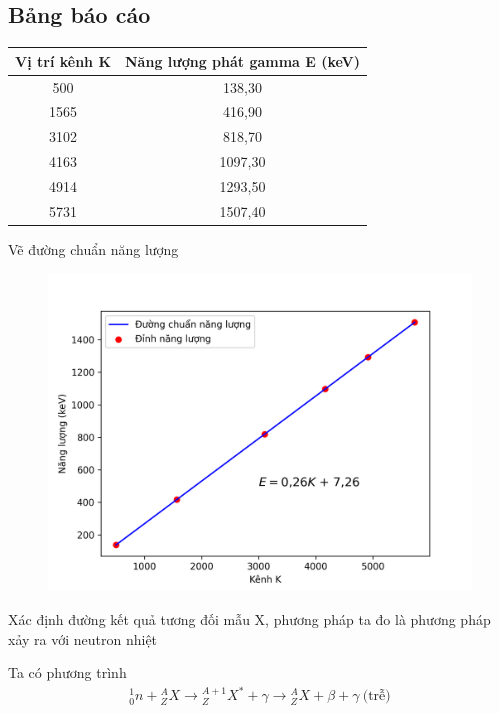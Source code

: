 \documentclass{article}
\begin{document}
\subsection{Bảng báo cáo}
\begin{table}[!ht]
    \centering
    \begin{tabular}{|c|c|}
    \hline
        Vị trí kênh K & Năng lượng phát gamma E (keV) \\ \hline
        500 & 138,30 \\ \hline
        1565 & 416,90 \\ \hline
        3102 & 818,70 \\ \hline
        4163 & 1097,30 \\ \hline
        4914 & 1293,50 \\ \hline
        5731 & 1507,40 \\ \hline
    \end{tabular}
\end{table}
Vẽ đường chuẩn năng lượng \\ \par
\begin{figure}[!th]
  \includegraphics[width=\linewidth]{plot}
\end{figure}
\newpage
Xác định đường kết quả tương đối mẫu X, phương pháp ta đo là phương pháp xảy ra với neutron nhiệt \par
Ta có phương trình
\begin{align*}
	{}_0^1 n + {}_Z^A X \rightarrow {}_Z^{A+1} X^* + \gamma \rightarrow{}_Z^{A} X +\beta + \gamma \ \text{(trễ)} 
\end{align*}
\end{document}
